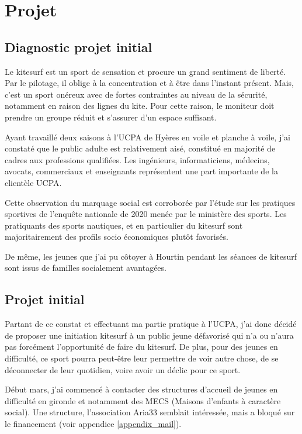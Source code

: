 \documentclass[11pt,a4paper]{report}
\begin{document}




\FloatBarrier
\section{Projet}
\subsection{Diagnostic projet initial}

Le kitesurf est un sport de sensation et procure un grand
sentiment de liberté. Par le pilotage, il oblige à 
la concentration et à \^etre dans l'instant présent.
Mais, c'est un sport onéreux avec de fortes contraintes
au niveau de la sécurité, notamment en raison des lignes du kite.
Pour cette raison, le moniteur doit prendre un groupe réduit
et s'assurer d'un espace suffisant. 

Ayant travaillé deux saisons à l'UCPA de Hyères en voile
et planche à voile, j'ai  constaté que le public adulte est relativement
aisé, constitué en majorité de cadres aux professions qualifiées. Les
ingénieurs, informaticiens, médecins, avocats, commerciaux et enseignants
représentent une part importante de la clientèle UCPA.

Cette observation du marquage social  est corroborée par l'étude sur 
les pratiques sportives de l'enqu\^ete nationale de
2020 menée par le ministère des sports\cite{injep}. Les pratiquants
des sports nautiques, et en particulier du kitesurf sont majoritairement
des profils socio économiques plut\^ot favorisés.

De m\^eme, les jeunes que j'ai pu côtoyer à Hourtin
pendant les séances de kitesurf sont issus de
familles socialement avantagées.

\subsection{Projet initial}

Partant de ce constat et effectuant ma partie pratique à l'UCPA,
j'ai donc décidé de proposer une initiation kitesurf à un public jeune
défavorisé qui n'a ou n'aura pas forcément l'opportunité de faire du kitesurf. 
De plus, pour des jeunes en difficulté, ce sport pourra peut-être 
leur permettre de voir autre chose, de se déconnecter de leur quotidien,
voire avoir un déclic pour ce sport.

Début mars, j'ai commencé à contacter des structures d'accueil de jeunes 
en difficulté en gironde et notamment des MECS (Maisons d'enfants à 
caractère social).
Une structure, l'association Aria33\cite{aria33} semblait 
intéressée, mais a bloqué sur le financement
(voir appendice \ref{appendix_mail}).
\end{document}

